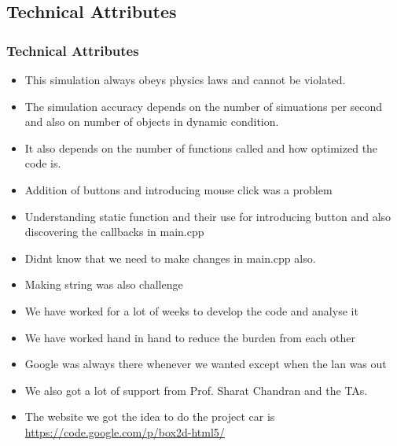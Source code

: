 \documentclass{beamer}
\begin{document}
\subsection{Technical Attributes}
\begin{frame}
\frametitle{Technical Attributes}
\begin{itemize}
\item This simulation always obeys physics laws and cannot be violated.
\item The simulation accuracy depends on the number of simuations per second and also on number of objects in dynamic condition.
\item It also depends on the number of functions called and how optimized the code is.
\end{itemize}
\end{frame}
\begin{frame}
\begin{itemize}
\frametitle{Challenges faced }
\item Addition of buttons and introducing mouse click was a problem
\item Understanding static function and their use for introducing button and also discovering the callbacks in main.cpp
\item Didnt know that we need to make changes in main.cpp also.
\item Making string was also challenge
\end{itemize}
\end{frame}
\begin{frame}
\begin{itemize}
\frametitle{Efforts }
\item We have worked for a lot of weeks to develop the code and analyse it
\item We have worked hand in hand to reduce the burden from each other
\end{itemize}
\end{frame}
\begin{frame}
\begin{itemize}
\frametitle{Acknowledgements }
\item Google was always there whenever we wanted except when the lan was out
\item We also got a lot of support from Prof. Sharat Chandran and the TAs.
\item The website we got the idea to do the project car is \url{https://code.google.com/p/box2d-html5/}
\end{itemize}
\end{frame}
\end{document}
